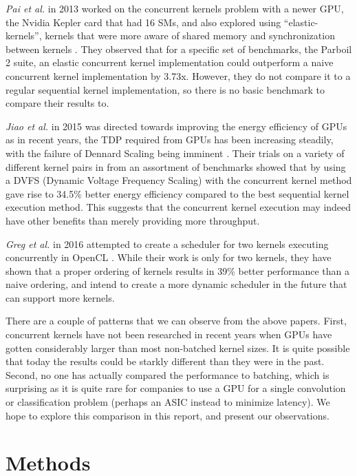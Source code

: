 \documentclass[sigconf]{acmart}
\begin{document}
\textit{Pai et al.} in 2013 worked on the concurrent kernels problem with a newer GPU, the Nvidia Kepler card that had 16 SMs, and also explored using “elastic-kernels”, kernels that were more aware of shared memory and synchronization between kernels \cite{pai_thazhuthaveetil_govindarajan_2013}. They observed that for a specific set of benchmarks, the Parboil 2 suite, an elastic concurrent kernel implementation could outperform a naive concurrent kernel implementation by 3.73x. However, they do not compare it to a regular sequential kernel implementation, so there is no basic benchmark to compare their results to. 

\textit{Jiao et al.} in 2015 was directed towards improving the energy efficiency of GPUs as in recent years, the TDP required from GPUs has been increasing steadily, with the failure of Dennard Scaling being imminent \cite{jiao_lu_huynh_mitra_2015}. Their trials on a variety of different kernel pairs in from an assortment of benchmarks showed that by using a DVFS (Dynamic Voltage Frequency Scaling) with the concurrent kernel method gave rise to 34.5\% better energy efficiency compared to the best sequential kernel execution method. This suggests that the concurrent kernel execution may indeed have other benefits than merely providing more throughput. 

\textit{Greg et al.} in 2016 attempted to create a scheduler for two kernels executing concurrently in OpenCL \cite{gregg_dorn_hazelwood_skadron_2016}. While their work is only for two kernels, they have shown that a proper ordering of kernels results in 39\% better performance than a naive ordering, and intend to create a more dynamic scheduler in the future that can support more kernels. 

There are a couple of patterns that we can observe from the above papers. First, concurrent kernels have not been researched in recent years when GPUs have gotten considerably larger than most non-batched kernel sizes. It is quite possible that today the results could be starkly different than they were in the past. Second, no one has actually compared the performance to batching, which is surprising as it is quite rare for companies to use a GPU for a single convolution or classification problem (perhaps an ASIC instead to minimize latency). We hope to explore this comparison in this report, and present our observations.

\section{Methods}
\end{document}
